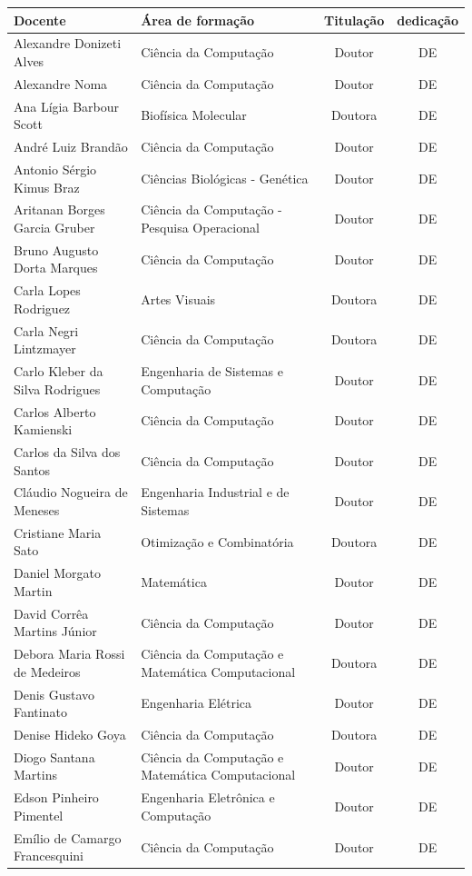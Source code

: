 \documentclass{article}
\begin{document}
\begin{longtable}{|l|l|c|c|}
\hline
Docente & Área de formação & Titulação & dedicação\\
\hline\hline
Alexandre Donizeti Alves & Ciência da Computação & Doutor & DE \\
Alexandre Noma & Ciência da Computação & Doutor & DE \\
Ana Lígia Barbour Scott & Biofísica Molecular & Doutora & DE \\
André Luiz Brandão & Ciência da Computação & Doutor & DE \\
Antonio Sérgio Kimus Braz & Ciências Biológicas - Genética & Doutor & DE \\
Aritanan Borges Garcia Gruber & Ciência da Computação - Pesquisa Operacional & Doutor & DE \\
Bruno Augusto Dorta Marques & Ciência da Computação & Doutor & DE \\
Carla Lopes Rodriguez & Artes Visuais & Doutora & DE \\
Carla Negri Lintzmayer & Ciência da Computação & Doutora & DE \\
Carlo Kleber da Silva Rodrigues & Engenharia de Sistemas e Computação & Doutor & DE \\
Carlos Alberto Kamienski & Ciência da Computação & Doutor & DE \\
Carlos da Silva dos Santos & Ciência da Computação & Doutor & DE \\
Cláudio Nogueira de Meneses & Engenharia Industrial e de Sistemas & Doutor & DE \\
Cristiane Maria Sato & Otimização e Combinatória & Doutora & DE \\
Daniel Morgato Martin & Matemática & Doutor & DE \\
David Corrêa Martins Júnior & Ciência da Computação & Doutor & DE \\
Debora Maria Rossi de Medeiros & Ciência da Computação e Matemática Computacional & Doutora & DE \\
Denis Gustavo Fantinato & Engenharia Elétrica & Doutor & DE \\
Denise Hideko Goya & Ciência da Computação & Doutora & DE \\
Diogo Santana Martins & Ciência da Computação e Matemática Computacional & Doutor & DE \\
Edson Pinheiro Pimentel & Engenharia Eletrônica e Computação & Doutor & DE \\
Emílio de Camargo Francesquini & Ciência da Computação & Doutor & DE \\

\end{longtable}
\end{document}
